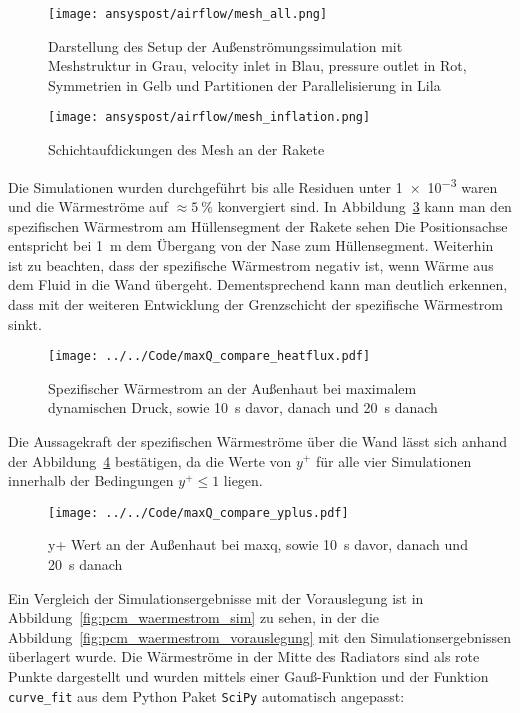 \begin{figure}
  \centering
  \texttt{[image: ansyspost/airflow/mesh\_all.png]}
  \caption{Darstellung des Setup der Außenströmungssimulation mit Meshstruktur in Grau, velocity inlet in Blau, pressure outlet in Rot, Symmetrien in Gelb und Partitionen der Parallelisierung in Lila}\label{fig:aussenstroemung_mesh}
\end{figure}

\begin{figure}
  \centering
  \texttt{[image: ansyspost/airflow/mesh\_inflation.png]}
  \caption{Schichtaufdickungen des Mesh an der Rakete}\label{fig:aussenstroemung_mesh_inflationlayers}
\end{figure}

Die Simulationen wurden durchgeführt bis alle Residuen unter \SI{1e-3}{} waren und die Wärmeströme auf $\approx\SI{5}{\percent}$ konvergiert sind.
In Abbildung~\ref{fig:spezifischer_waermestrom_maxQ_simulationen} kann man den spezifischen Wärmestrom am Hüllensegment der Rakete sehen
Die Positionsachse entspricht bei \SI{1}{\meter} dem Übergang von der Nase zum Hüllensegment. Weiterhin ist zu beachten, dass der spezifische Wärmestrom
negativ ist, wenn Wärme aus dem Fluid in die Wand übergeht. Dementsprechend kann man deutlich erkennen, dass mit der weiteren Entwicklung der Grenzschicht
der spezifische Wärmestrom sinkt.

\begin{figure}
  \centering
  \texttt{[image: ../../Code/maxQ\_compare\_heatflux.pdf]}
  \caption{Spezifischer Wärmestrom an der Außenhaut bei maximalem dynamischen Druck, sowie \SI{10}{s} davor, danach und \SI{20}{s} danach}\label{fig:spezifischer_waermestrom_maxQ_simulationen}
\end{figure}

Die Aussagekraft der spezifischen Wärmeströme über die Wand lässt sich anhand der Abbildung~\ref{fig:yplus_maxQ_simulationen} bestätigen, da die Werte von $y^+$
für alle vier Simulationen innerhalb der Bedingungen $y^+ \leq 1$ liegen.

\begin{figure}
  \centering
  \texttt{[image: ../../Code/maxQ\_compare\_yplus.pdf]}
  \caption{y+ Wert an der Außenhaut bei \ac{maxq}, sowie \SI{10}{s} davor, danach und \SI{20}{s} danach}\label{fig:yplus_maxQ_simulationen}
\end{figure}

Ein Vergleich der Simulationsergebnisse mit der Vorauslegung ist in Abbildung~\ref{fig:pcm_waermestrom_sim} zu sehen, in der die Abbildung~\ref{fig:pcm_waermestrom_vorauslegung} mit den
Simulationsergebnissen überlagert wurde. Die Wärmeströme in der Mitte des Radiators sind als rote Punkte dargestellt und wurden mittels einer Gauß-Funktion und der Funktion \texttt{curve\_fit} aus dem
Python Paket \texttt{SciPy} automatisch angepasst:


